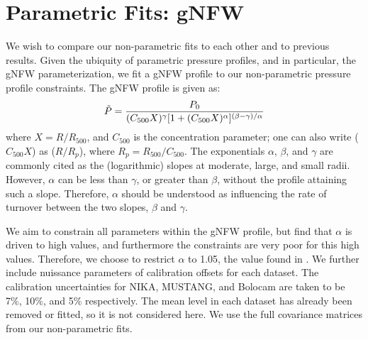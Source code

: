 \documentclass[iop,numberedappendix,apj]{emulateapj}
\begin{document}


\section{Parametric Fits: gNFW}
\label{sec:parfits}

We wish to compare our non-parametric fits to each other and to previous results. Given the ubiquity of
parametric pressure profiles, and in particular, the gNFW parameterization, we fit a gNFW profile
to our non-parametric pressure profile constraints. The gNFW profile is given as:
\begin{equation}
  \Tilde{P} = \frac{P_0}{(C_{500} X)^{\gamma} [1 + (C_{500} X)^{\alpha}]^{(\beta - \gamma)/\alpha}}
  \label{eqn:gnfw_profile}
\end{equation}
where $X = R / R_{500}$, and $C_{500}$ is the concentration parameter; one can also write ($C_{500} X$) as
($R / R_p$), where $R_p = R_{500}/C_{500}$. The exponentials $\alpha$, $\beta$, and $\gamma$ are commonly
cited as the (logarithmic) slopes at moderate, large, and small radii. However, $\alpha$ can be less than
$\gamma$, or greater than $\beta$, without the profile attaining such a slope. Therefore, $\alpha$ should
be understood as influencing the rate of turnover between the two slopes, $\beta$ and $\gamma$. 


We aim to constrain all parameters within the gNFW profile, but find that $\alpha$ is driven to high values, and
furthermore the constraints are very poor for this high values. Therefore, we choose to restrict $\alpha$ to 1.05,
the value found in \citet{arnaud2010}. We further include nuissance parameters of calibration offsets for each dataset.
The calibration uncertainties for NIKA, MUSTANG, and Bolocam are taken to be 7\%, 10\%, and 5\% respectively.
The mean level in each dataset has already been removed or fitted, so it is not considered here. We use the full
covariance matrices from our non-parametric fits.
\end{document}
